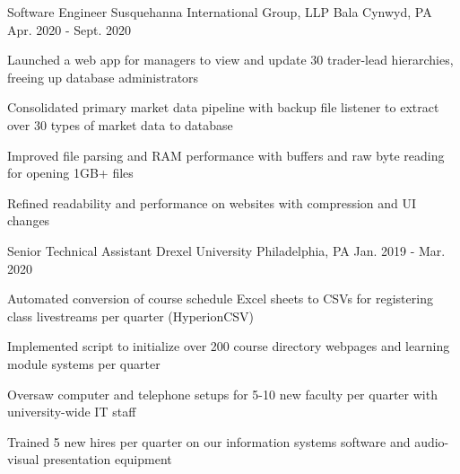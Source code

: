 

\begin{cventries}

  \cventry
  {Software Engineer} %
  {Susquehanna International Group, LLP} %
  {Bala Cynwyd, PA} %
  {Apr. 2020 - Sept. 2020} %
  {
    \begin{cvitems} %
      \item {Launched a web app for managers to view and update 30 trader-lead hierarchies, freeing up database administrators}
      \item {Consolidated primary market data pipeline with backup file listener to extract over 30 types of market data to database}
      \item {Improved file parsing and RAM performance with buffers and raw byte reading for opening 1GB+ files}
      \item {Refined readability and performance on websites with compression and UI changes}
    \end{cvitems}
  }

  \cventry
  {Senior Technical Assistant} %
  {Drexel University} %
  {Philadelphia, PA} %
  {Jan. 2019 - Mar. 2020} %
  {
    \begin{cvitems} %
      \item {Automated conversion of course schedule Excel sheets to CSVs for registering class livestreams per quarter (HyperionCSV)}
      \item {Implemented script to initialize over 200 course directory webpages and learning module systems per quarter}
      \item {Oversaw computer and telephone setups for 5-10 new faculty per quarter with university-wide IT staff}
      \item {Trained 5 new hires per quarter on our information systems software and audio-visual presentation equipment}
    \end{cvitems}
  }

\end{cventries}
